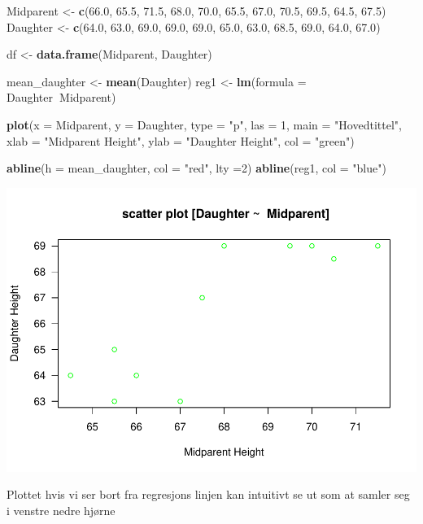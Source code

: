 \documentclass[]{article}
\newenvironment{Shaded}{\begin{snugshade}}{\end{snugshade}}
\newcommand{\DataTypeTok}[1]{\textcolor[rgb]{0.13,0.29,0.53}{#1}}
\newcommand{\DecValTok}[1]{\textcolor[rgb]{0.00,0.00,0.81}{#1}}
\newcommand{\FloatTok}[1]{\textcolor[rgb]{0.00,0.00,0.81}{#1}}
\newcommand{\KeywordTok}[1]{\textcolor[rgb]{0.13,0.29,0.53}{\textbf{#1}}}
\newcommand{\NormalTok}[1]{#1}
\newcommand{\OperatorTok}[1]{\textcolor[rgb]{0.81,0.36,0.00}{\textbf{#1}}}
\newcommand{\StringTok}[1]{\textcolor[rgb]{0.31,0.60,0.02}{#1}}
\begin{document}
\begin{Shaded}
\begin{Highlighting}[]
\NormalTok{Midparent <-}\StringTok{ }\KeywordTok{c}\NormalTok{(}\FloatTok{66.0}\NormalTok{, }\FloatTok{65.5}\NormalTok{, }\FloatTok{71.5}\NormalTok{, }\FloatTok{68.0}\NormalTok{, }\FloatTok{70.0}\NormalTok{, }\FloatTok{65.5}\NormalTok{, }\FloatTok{67.0}\NormalTok{, }\FloatTok{70.5}\NormalTok{, }\FloatTok{69.5}\NormalTok{, }\FloatTok{64.5}\NormalTok{, }\FloatTok{67.5}\NormalTok{)}
\NormalTok{Daughter <-}\StringTok{ }\KeywordTok{c}\NormalTok{(}\FloatTok{64.0}\NormalTok{, }\FloatTok{63.0}\NormalTok{, }\FloatTok{69.0}\NormalTok{, }\FloatTok{69.0}\NormalTok{, }\FloatTok{69.0}\NormalTok{, }\FloatTok{65.0}\NormalTok{, }\FloatTok{63.0}\NormalTok{, }\FloatTok{68.5}\NormalTok{, }\FloatTok{69.0}\NormalTok{, }\FloatTok{64.0}\NormalTok{, }\FloatTok{67.0}\NormalTok{)}

\NormalTok{df <-}\StringTok{ }\KeywordTok{data.frame}\NormalTok{(Midparent, Daughter)}

\NormalTok{mean_daughter <-}\StringTok{ }\KeywordTok{mean}\NormalTok{(Daughter)}
\NormalTok{reg1 <-}\StringTok{ }\KeywordTok{lm}\NormalTok{(}\DataTypeTok{formula =}\NormalTok{ Daughter}\OperatorTok{~}\NormalTok{Midparent)}


\KeywordTok{plot}\NormalTok{(}\DataTypeTok{x =}\NormalTok{ Midparent, }\DataTypeTok{y =}\NormalTok{ Daughter, }\DataTypeTok{type =} \StringTok{"p"}\NormalTok{, }\DataTypeTok{las =} \DecValTok{1}\NormalTok{,}
\DataTypeTok{main =} \StringTok{"Hovedtittel"}\NormalTok{, }\DataTypeTok{xlab =} \StringTok{"Midparent Height"}\NormalTok{, }\DataTypeTok{ylab =} \StringTok{"Daughter Height"}\NormalTok{, }\DataTypeTok{col =} \StringTok{"green"}\NormalTok{)}



\KeywordTok{abline}\NormalTok{(}\DataTypeTok{h =}\NormalTok{ mean_daughter, }\DataTypeTok{col =} \StringTok{"red"}\NormalTok{, }\DataTypeTok{lty =}\DecValTok{2}\NormalTok{)}
\KeywordTok{abline}\NormalTok{(reg1, }\DataTypeTok{col =} \StringTok{"blue"}\NormalTok{)}
\end{Highlighting}
\end{Shaded}

\includegraphics{OBLIG2-STAT111_files/figure-latex/unnamed-chunk-1-1.pdf}

Plottet hvis vi ser bort fra regresjons linjen kan intuitivt se ut som
at samler seg i venstre nedre hjørne
\end{document}
